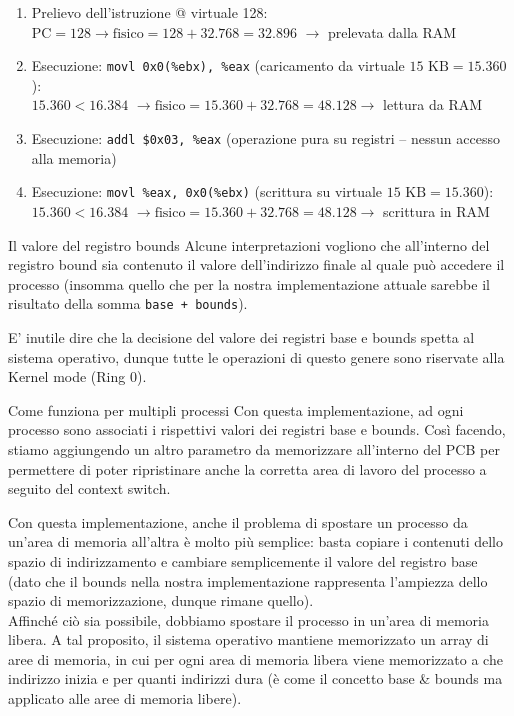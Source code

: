 \documentclass[12pt]{report}
\begin{document}
	\begin{enumerate}
		\item Prelievo dell'istruzione @ virtuale 128:\\
		$\text{PC} = 128 \rightarrow \text{fisico} = 128 + 32{.}768 = 32{.}896$ \checkmark $\rightarrow$ prelevata dalla RAM
		
		\item Esecuzione: \texttt{movl 0x0(\%ebx), \%eax} (caricamento da virtuale $15\text{ KB} = 15{.}360$):\\
		$15{.}360 < 16{.}384$ \checkmark $\rightarrow \text{fisico} = 15{.}360 + 32{.}768 = 48{.}128 \rightarrow$ lettura da RAM
		
		\item Esecuzione: \texttt{addl \$0x03, \%eax} (operazione pura su registri -- nessun accesso alla memoria)
		
		\item Esecuzione: \texttt{movl \%eax, 0x0(\%ebx)} (scrittura su virtuale $15\text{ KB} = 15{.}360$):\\
		$15{.}360 < 16{.}384$ \checkmark $\rightarrow \text{fisico} = 15{.}360 + 32{.}768 = 48{.}128 \rightarrow$ scrittura in RAM
	\end{enumerate}
	
	\begin{osservazione}{Il valore del registro bounds}{}
		Alcune interpretazioni vogliono che all'interno del registro bound sia contenuto il valore dell'indirizzo finale al quale può accedere il processo (insomma quello che per la nostra implementazione attuale sarebbe il risultato della somma \texttt{base + bounds}).
	\end{osservazione}
	
	E' inutile dire che la decisione del valore dei registri base e bounds spetta al sistema operativo, dunque tutte le operazioni di questo genere sono riservate alla Kernel mode (Ring 0).
	
	\begin{osservazione}{Come funziona per multipli processi}{}
		Con questa implementazione, ad ogni processo sono associati i rispettivi valori dei registri base e bounds. Così facendo, stiamo aggiungendo un altro parametro da memorizzare all'interno del PCB per permettere di poter ripristinare anche la corretta area di lavoro del processo a seguito del context switch.
	\end{osservazione}
	
	Con questa implementazione, anche il problema di spostare un processo da un'area di memoria all'altra è molto più semplice: basta copiare i contenuti dello spazio di indirizzamento e cambiare semplicemente il valore del registro base (dato che il bounds nella nostra implementazione rappresenta l'ampiezza dello spazio di memorizzazione, dunque rimane quello).\\
	Affinché ciò sia possibile, dobbiamo spostare il processo in un'area di memoria libera. A tal proposito, il sistema operativo mantiene memorizzato un array di aree di memoria, in cui per ogni area di memoria libera viene memorizzato a che indirizzo inizia e per quanti indirizzi dura (è come il concetto base \& bounds ma applicato alle aree di memoria libere).
	
\end{document}
